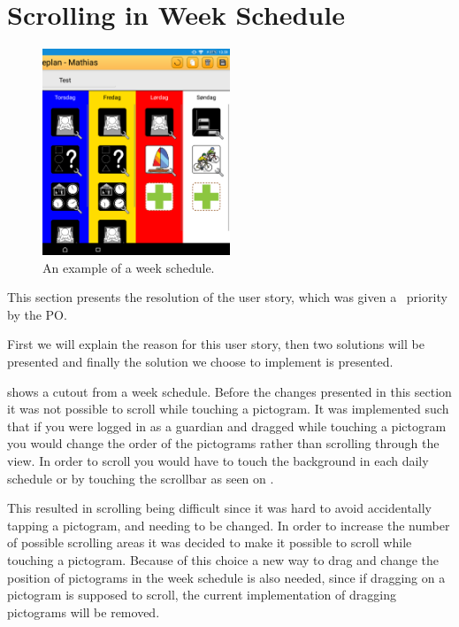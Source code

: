 \section{Scrolling in Week Schedule}

\begin{figure} 
    \centering
        \includegraphics[width=0.5\textwidth]{figures/img/screenshots/weekplan_schedule.png}
    \caption{An example of a week schedule.}
    \label{fig:weekschedule}
\end{figure}

This section presents the resolution of the user story, which was given a \phigh~priority by the PO.

First we will explain the reason for this user story, then two solutions will be presented and finally the solution we choose to implement is presented. 

 shows a cutout from a week schedule. 
Before the changes presented in this section it was not possible to scroll while touching a pictogram. 
It was implemented such that if you were logged in as a guardian and dragged while touching a pictogram you would change the order of the pictograms rather than scrolling through the view.
In order to scroll you would have to touch the background in each daily schedule or by touching the scrollbar as seen on .

This resulted in scrolling being difficult since it was hard to avoid accidentally tapping a pictogram, and needing to be changed.
In order to increase the number of possible scrolling areas it was decided to make it possible to scroll while touching a pictogram.
Because of this choice a new way to drag and change the position of pictograms in the week schedule is also needed, since if dragging on a pictogram is supposed to scroll, the current implementation of dragging pictograms will be removed.

